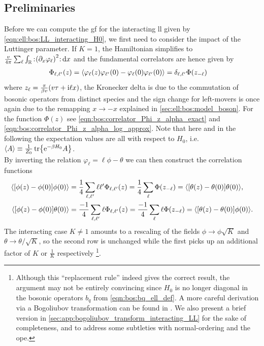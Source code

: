 \subsection{Preliminaries}\label{sec:ell:gf:preliminaries}
Before we can compute the \gls{gf} for the interacting \gls{ll} given by \autoref{eqn:ell:bos:LL_interacting_H0}, we first need to consider the impact of the Luttinger parameter.
If $K=1$, the Hamiltonian simplifies to $\frac{v}{4\pi} \sum_\ell \intr{\normord{\kla*{\partial_x\varphi_\ell}^2}}{x} $ and the fundamental correlators are hence given by
\begin{align}
\Phi_{\ell,\ell'}(z) &= \bra*{\varphi_\ell(z) \varphi_{\ell'}(0) - \varphi_\ell(0) \varphi_{\ell'}(0)} = \delta_{\ell,\ell'} \Phi(z_{-\ell}) \label{eqn:ell:gf:Phi_ell_ellp_of_z}
\end{align}
where $z_\ell = \frac{\pi}{\beta v} \kla*{v\tau + \i\ell x}$, the Kronecker delta is due to the commutation of bosonic operators from distinct species and the sign change for left-movers is once again due to the remapping $x\rightarrow -x$ explained in \autoref{sec:ell:bos:model_boson}.
For the function $\Phi(z)$ see \autoref{eqn:bos:correlator_Phi_z_alpha_exact} and \autoref{eqn:bos:correlator_Phi_z_alpha_log_approx}.
Note that here and in the following the expectation values are all with respect to $H_0$, i.e. $\bra*{A} \equiv \frac{1}{Z_0} \tr \klc*{\powe{-\beta H_0} A}$.\\
By inverting the relation $\varphi_\ell = \ell \phi - \theta$ we can then construct the correlation functions %
\begin{align*}
\bra*{\klb*{\phi(z) - \phi(0)} \phi(0)} &= \frac{1}{4} \sum_{\ell,\ell'} \ell\ell' \Phi_{\ell,\ell'}(z) = \frac{1}{4} \sum_\ell \Phi(z_{-\ell}) = \bra*{\klb*{\theta(z) - \theta(0)} \theta(0)},\\
\bra*{\klb*{\phi(z) - \phi(0)} \theta(0)} &= \frac{-1}{4} \sum_{\ell,\ell'} \ell\Phi_{\ell,\ell'}(z)= \frac{-1}{4} \sum_\ell \ell\Phi(z_{-\ell}) = \bra*{\klb*{\theta(z) - \theta(0)} \phi(0)}.
\end{align*}
The interacting case $K\neq 1$ amounts to a rescaling of the fields $\phi\rightarrow \phi \sqrt{K}$ and $\theta\rightarrow \theta / \sqrt{K}$, so the second row is unchanged while the first picks up an additional factor of $K$ or $\frac{1}{K}$ respectively \cite[]{Giamarchi_2004}\footnote{Although this ``replacement rule'' indeed gives the correct result, the argument may not be entirely convincing since $H_0$ is no longer diagonal in the bosonic operators $b_q$ from \autoref{eqn:bos:bq_ell_def}.
A more careful derivation via a Bogoliubov transformation can be found in \cites[\ssec 10.B]{Bosonization_DelftSchoeller_1998}[]{Bosonization_Rao_2001}.
We also present a brief version in \autoref{sec:app:bogoliubov_transform_interacting_LL} for the sake of completeness, and to address some subtleties with normal-ordering and the \acrlong{ope}.}.\\
